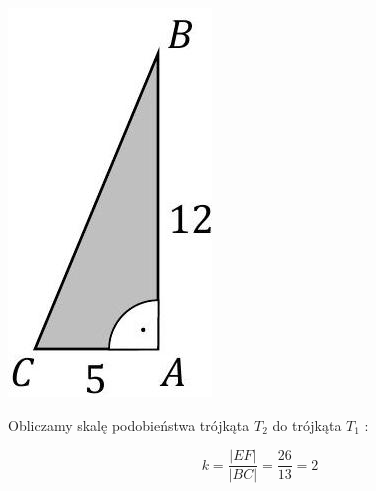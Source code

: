 \documentclass[10pt]{article}
\begin{document}
\begin{center}
\includegraphics[max width=\textwidth]{2025_02_07_83b95a6405af75d2626bg-26}
\end{center}

Obliczamy skalę podobieństwa trójkąta $T_{2}$ do trójkąta $T_{1}$ :

$$
k=\frac{|E F|}{|B C|}=\frac{26}{13}=2
$$
\end{document}
